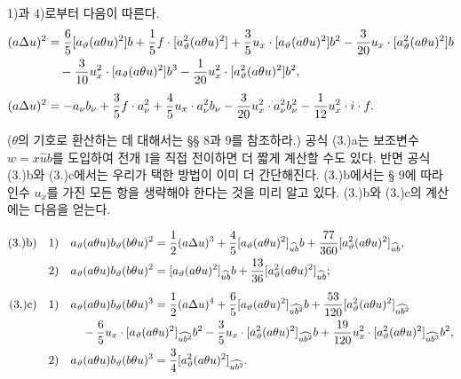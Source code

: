 1)과 4)로부터 다음이 따른다.
\[
\begin{aligned}
(a\Delta u)^2
&=\frac65[a_\vartheta(a\theta u)^2]b+\frac15f\cdot[a_\vartheta^2(a\theta u)^2]+\frac35u_x\cdot[a_\vartheta(a\theta u)^2]b^2-\frac3{20}u_x\cdot[a_\vartheta^2(a\theta u)^2]b\\
&\quad-\frac3{10}u_x^2\cdot[a_\vartheta(a\theta u)^2]b^3-\frac1{20}u_x^2\cdot[a_\vartheta^2(a\theta u)^2]b^2,\\[0.4em]
(a\Delta u)^2&=-a_\nu b_\nu+\frac35f\cdot a_\nu^2+\frac45u_x\cdot a_\nu^2b_\nu-\frac3{20}u_x^2\cdot a_\nu^2b_\nu^2-\frac1{12}u_x^2\cdot i\cdot f.
\end{aligned}
\]

($\theta$의 기호로 환산하는 데 대해서는 §§ 8과 9를 참조하라.)
공식 (3.)a는 보조변수 $w=x\widehat{u}b$를 도입하여 전개 I을 직접 전이하면 더 짧게 계산할 수도 있다. 반면 공식 (3.)b와 (3.)c에서는 우리가 택한 방법이 이미 더 간단해진다. (3.)b에서는 § 9에 따라 인수 $u_x$를 가진 모든 항을 생략해야 한다는 것을 미리 알고 있다. (3.)b와 (3.)c의 계산에는 다음을 얻는다.

\[
\begin{aligned}
(3.)\mathrm{b)}\quad 1)&\quad a_\vartheta(a\theta u)b_\vartheta(b\theta u)^2=\frac12(a\Delta u)^3+\frac45[a_\vartheta(a\theta u)^2]_{\widehat{ub}}b+\frac{77}{360}[a_\vartheta^2(a\theta u)^2]_{\widehat{ub}},\\
2)&\quad a_\vartheta(a\theta u)b_\vartheta(b\theta u)^2=[a_\vartheta(a\theta u)^2]_{\widehat{ub}}b+\frac{13}{36}[a_\vartheta^2(a\theta u)^2]_{\widehat{ub}};\\[0.5em]
(3.)\mathrm{c)}\quad 1)&\quad a_\vartheta(a\theta u)b_\vartheta(b\theta u)^3=\frac12(a\Delta u)^4+\frac65[a_\vartheta(a\theta u)^2]_{\widehat{ub^2}}b+\frac{53}{120}[a_\vartheta^2(a\theta u)^2]_{\widehat{ub^2}}\\
&\qquad-\frac65u_x\cdot[a_\vartheta(a\theta u)^2]_{\widehat{ub^2}}b^2-\frac35u_x\cdot[a_\vartheta^2(a\theta u)^2]_{\widehat{ub^2}}b+\frac{19}{120}u_x^2\cdot[a_\vartheta^2(a\theta u)^2]_{\widehat{ub^3}}b^2,\\
2)&\quad a_\vartheta(a\theta u)b_\vartheta(b\theta u)^3=\frac34[a_\vartheta^2(a\theta u)^2]_{\widehat{ub^2}}.
\end{aligned}
\]

